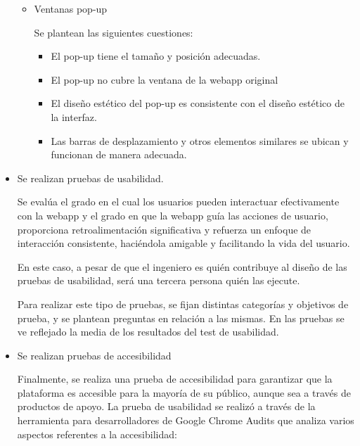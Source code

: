 \begin{itemize}
\begin{itemize}
\item Ventanas pop-up


Se plantean las siguientes cuestiones:



\begin{itemize}

\item El pop-up tiene el tamaño y posición adecuadas. 
\item El pop-up no cubre la ventana de la webapp original 
\item El diseño estético del pop-up es consistente con el diseño estético de la interfaz. 
\item Las barras de desplazamiento y otros elementos similares se ubican y funcionan de manera adecuada.
\end{itemize}
\end{itemize}
\item Se realizan pruebas de usabilidad.


Se evalúa el grado en el cual los usuarios pueden interactuar efectivamente con la webapp y el grado en que la webapp guía las acciones de usuario, proporciona retroalimentación significativa y refuerza un enfoque de interacción consistente, haciéndola amigable y facilitando la vida del usuario.


En este caso, a pesar de que el ingeniero es quién contribuye al diseño de las pruebas de usabilidad, será una tercera persona quién las ejecute.


Para realizar este tipo de pruebas, se fijan distintas categorías y objetivos de prueba, y se plantean preguntas en relación a las mismas. En las pruebas se ve reflejado la media de los resultados del test de usabilidad.

\item Se realizan pruebas de accesibilidad


Finalmente, se realiza una prueba de accesibilidad para garantizar que la plataforma es accesible para la mayoría de su público, aunque sea a través de productos de apoyo. La prueba de usabilidad se realizó a través de la herramienta para desarrolladores de Google Chrome Audits que analiza varios aspectos referentes a la accesibilidad:


\end{itemize}
